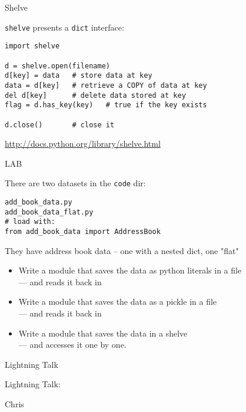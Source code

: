 \documentclass{beamer}
\begin{document}
\begin{frame}[fragile]{Shelve}

{\Large \verb|shelve| presents a \verb|dict| interface:}
\begin{verbatim}
import shelve

d = shelve.open(filename) 
d[key] = data   # store data at key 
data = d[key]   # retrieve a COPY of data at key 
del d[key]      # delete data stored at key 
flag = d.has_key(key)   # true if the key exists

d.close()       # close it
\end{verbatim}

\vfill
\url{http://docs.python.org/library/shelve.html}
\end{frame} 

\begin{frame}[fragile]{LAB}

{\large There are two datasets in the \verb|code| dir:}

\begin{verbatim}
add_book_data.py
add_book_data_flat.py
# load with:
from add_book_data import AddressBook
\end{verbatim}

They have address book data -- one with a nested dict, one "flat"

\begin{itemize}
  \item Write a module that saves the data as python literals in a file\\
        --- and reads it back in
  \item Write a module that saves the data as a pickle in a file\\
        --- and reads it back in
  \item Write a module that saves the data in a shelve\\
        --- and accesses it one by one.
\end{itemize}

\end{frame}

\begin{frame}{Lightning Talk}

{\centering

\vfill
{\LARGE Lightning Talk:  }

\vfill
{\Huge Chris}

\vfill
}
\end{frame}
\end{document}
